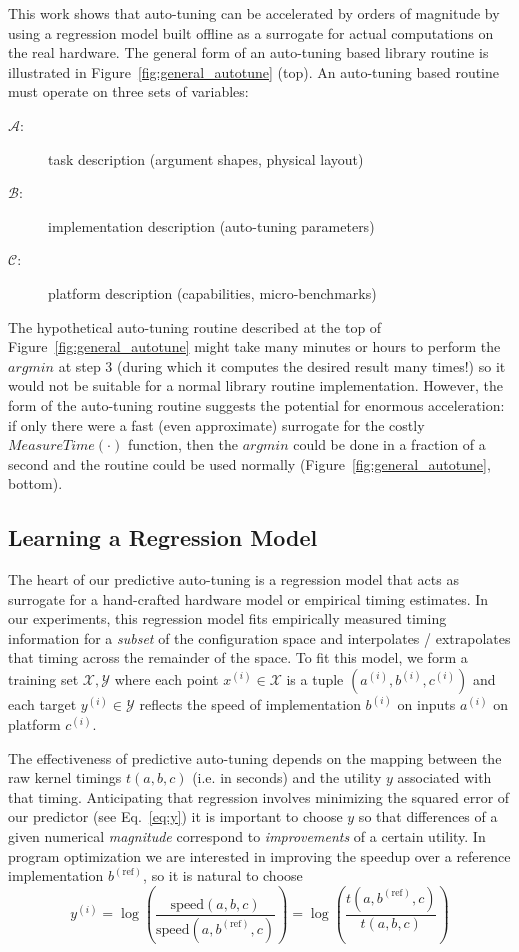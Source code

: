 \documentclass{sig-alternate}
\begin{document}
This work shows that auto-tuning can be accelerated by orders of
magnitude by using a regression model built offline as a surrogate for actual
computations on the real hardware.
The general form of an auto-tuning based library routine is illustrated in Figure~\ref{fig:general_autotune} (top).
An auto-tuning based routine must operate on three sets of variables:
\begin{description}
\item[$\mathcal{A}$:] task description (argument shapes, physical layout)
\item[$\mathcal{B}$:] implementation description (auto-tuning parameters)
\item[$\mathcal{C}$:] platform description (capabilities, micro-benchmarks)
\end{description}
The hypothetical auto-tuning routine described at the top of Figure~\ref{fig:general_autotune}
might take many minutes or hours to perform the $argmin$ at step 3 (during which it computes the desired result many times!)
so it would not be suitable for a normal library routine implementation.
However, the form of the auto-tuning routine suggests the potential for enormous acceleration:
if only there were a fast (even approximate) surrogate for the costly $MeasureTime(\cdot)$ function,
then the $argmin$ could be done in a fraction of a second and the routine could be used normally (Figure~\ref{fig:general_autotune}, bottom).

\subsection{Learning a Regression Model}

The heart of our predictive auto-tuning is a regression model that acts as surrogate
for a hand-crafted hardware model or empirical timing estimates.
In our experiments, this regression model fits empirically measured timing information for a {\em subset} of the configuration space and interpolates / extrapolates that timing across the remainder of the space.
To fit this model, we
form a training set $\mathcal{X}, \mathcal{Y}$ where
each point $x^{(i)} \in \mathcal{X}$ is a tuple $(a^{(i)}, b^{(i)}, c^{(i)})$
and each target $y^{(i)} \in \mathcal{Y}$  reflects the speed of implementation $b^{(i)}$
on inputs $a^{(i)}$ on platform $c^{(i)}$.

The effectiveness of predictive auto-tuning depends on the mapping between the raw kernel timings $t(a, b, c)$ (i.e. in seconds) and the utility $y$ associated with that timing.
Anticipating that regression involves minimizing the squared error of our predictor (see Eq.~\ref{eq:y}) it is important to choose $y$ so that differences of a given numerical {\em magnitude} correspond to {\em improvements} of a certain utility.
In program optimization we are interested in improving the speedup over a reference implementation $b^{(\mathrm{ref})}$, so it is natural to choose
\begin{equation}
y^{(i)}
= \log\left(\frac{\mathrm{speed}(a, b, c)}{\mathrm{speed}(a, b^{(\mathrm{ref})}, c)} \right)
= \log\left(\frac{t(a, b^{(\mathrm{ref})}, c)}{t(a, b, c)} \right)
\label{eq:y}
\end{equation}
\end{document}

